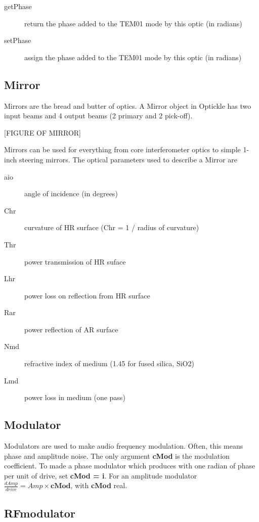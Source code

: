 \documentclass[12pt]{article}
\begin{document}
\begin{description}
  \item[getPhase] return the phase added to the TEM01 mode by this optic (in radians)
  \item[setPhase] assign the phase added to the TEM01 mode by this optic (in radians)
\end{description}

\subsection{Mirror}

Mirrors are the bread and butter of optics.
A Mirror object in Optickle has two input beams and 4 output beams (2 primary and 2 pick-off).

[FIGURE OF MIRROR]

Mirrors can be used for everything from core interferometer optics to simple 1-inch steering mirrors.
The optical parameters used to describe a Mirror are

\begin{description}
  \item[aio] angle of incidence (in degrees)
  \item[Chr] curvature of HR surface (Chr = 1 / radius of curvature)
  \item[Thr] power transmission of HR suface
  \item[Lhr] power loss on reflection from HR surface
  \item[Rar] power reflection of AR surface
  \item[Nmd] refractive index of medium (1.45 for fused silica, SiO2)
  \item[Lmd] power loss in medium (one pass)
\end{description}

\subsection{Modulator}

Modulators are used to make audio frequency modulation.
Often, this means phase and amplitude noise.
The only argument {\bf cMod} is the modulation coefficient.
To made a phase modulator which produces with one radian of phase per unit of drive, set {\bf cMod = i}.
For an amplitude modulator $\frac{dAmp}{drive} = Amp \times \mathbf{cMod}$, with {\bf cMod} real.

\subsection{RFmodulator}
\end{document}
